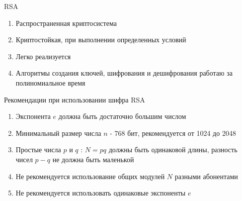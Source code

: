 \begin{center}		

	\begin{block}{RSA}
		\begin{enumerate}
			\item Распространенная криптосистема
			\item Криптостойкая, при выполнении определенных условий
			\item Легко реализуется
			\item Алгоритмы создания ключей, шифрования и дешифрования работаю за полиномиальное время
		\end{enumerate}	
	\end{block}

	\begin{block}{Рекомендации при использовании шифра RSA}
		\begin{enumerate}
			\item Экспонента $e$ должна быть достаточно большим числом
			\item Минимальный размер числа $n$ - 768 бит, рекомендуется от 1024 до 2048
			\item Простые числа $p$ и $q$ : $N=pq$ должны быть одинаковой длины, разность чисел $p - q$ не должна быть маленькой
			\item Не рекомендуется использование общих модулей $N$ разными абонентами
			\item Не рекомендуется использовать одинаковые экспоненты $e$
		\end{enumerate}	
	\end{block}

\end{center}